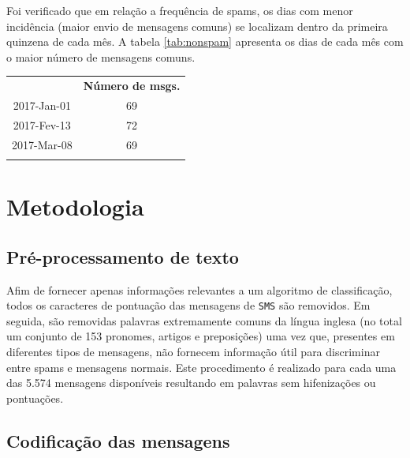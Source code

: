 \documentclass[a4paper,11pt]{article}
\begin{document}
\newpage
Foi verificado que em relação a frequência de spams, os dias com menor incidência (maior envio de 
mensagens comuns) se localizam dentro da primeira quinzena de cada mês. A tabela \ref{tab:nonspam} 
apresenta os dias de cada mês com o maior número de mensagens comuns.

\vspace{.5cm}
\begin{center}
\begin{tabular}{cc}
 \hline
	       &  \textbf{Número de msgs.} \\
  2017-Jan-01  &  69 \\
  2017-Fev-13  &  72 \\
  2017-Mar-08  &  69 \\
 \hline
 \label{tab:nonspam}
\end{tabular}
\end{center}









\section{Metodologia}


\subsection{Pré-processamento de texto}

Afim de fornecer apenas informações relevantes a um algoritmo de classificação, todos os 
caracteres de pontuação das mensagens de \texttt{SMS} são removidos. Em seguida, são 
removidas palavras extremamente comuns da língua inglesa (no total um conjunto de 153 pronomes, 
artigos e preposições) uma vez que, presentes em diferentes tipos de mensagens, não fornecem 
informação útil para discriminar entre spams e mensagens normais. Este procedimento é realizado 
para cada uma das 5.574 mensagens disponíveis resultando em palavras sem hifenizações ou 
pontuações.


\subsection{Codificação das mensagens}
\end{document}
